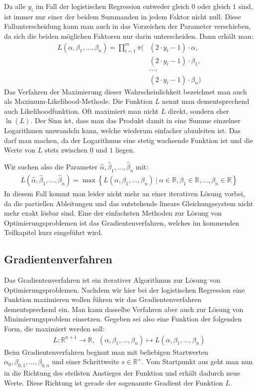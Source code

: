 Da alle $y_i$ im Fall der logistischen Regression entweder gleich $0$ oder gleich $1$ sind, ist immer nur einer der beidem Summanden in jedem Faktor nicht null. Diese Fallunterscheidung kann man auch in das Vorzeichen der Parameter verschieben, da sich die beiden möglichen Faktoren nur darin unterscheiden. Dann erhält man:
\begin{align*}
    L(\alpha, \beta_1, \dots, \beta_n) = \prod_{i=1}^m \pi(&(2 \cdot y_i - 1) \cdot \alpha, \\
    &(2 \cdot y_i - 1) \cdot \beta_1, \\
    &\dots, \\
    &(2 \cdot y_i - 1) \cdot \beta_n)
\end{align*}
Das Verfahren der Maximierung dieser Wahrscheinlichkeit bezeichnet man auch als Maximum-Likelihood-Methode. Die Funktion $L$ nennt man dementsprechend auch Likelihoodfunktion. Oft maximiert man nicht $L$ direkt, sondern eher $\ln(L)$. Der Sinn ist, dass man das Produkt damit in eine Summe einzelner Logarithmen umwandeln kann, welche wiederum einfacher abzuleiten ist. Das darf man machen, da der Logarithmus eine stetig wachsende Funktion ist und die Werte von $L$ stets zwischen $0$ und $1$ liegen.

Wir suchen also die Parameter $\hat\alpha, \hat\beta_1, \dots, \hat\beta_n$ mit:
\begin{align*}
    L(\hat\alpha, \hat\beta_1, \dots, \hat\beta_n) = \max \left\{ L(\alpha, \beta_1, \dots, \beta_n) ~|~ \alpha \in \mathbb{R}, \beta_1 \in \mathbb{R}, \dots, \beta_n \in \mathbb{R} \right\}
\end{align*}
In diesem Fall kommt man leider nicht mehr an einer iterativen Lösung vorbei, da die partiellen Ableitungen und das entstehende lineare Gleichungssystem nicht mehr exakt lösbar sind. Eine der einfachsten Methoden zur Lösung von Optimierungsproblemen ist das Gradientenverfahren, welches im kommenden Teilkapitel kurz eingeführt wird.

\subsection{Gradientenverfahren}

Das Gradientenverfahren ist ein iterativer Algorithmus zur Lösung von Optimierungsproblemen. Nachdem wir hier bei der logistischen Regression eine Funktion maximieren wollen führen wir das Gradientenverfahren dementsprechend ein. Man kann dasselbe Verfahren aber auch zur Lösung von Minimierungsproblem einsetzen. Gegeben sei also eine Funktion der folgenden Form, die maximiert werden soll:
\begin{align*}
    L: \mathbb{R}^{n+1} \rightarrow \mathbb{R},~~ (\alpha, \beta_1, \dots, \beta_n) \mapsto L(\alpha, \beta_1, \dots, \beta_n)
\end{align*}
Beim Gradientenverfahren beginnt man mit beliebigen Startwerten $\alpha_0, \beta_{0, 1}, \dots, \beta_{0, n}$ und einer Schrittweite $s \in \mathbb{R}^+$. Vom Startpunkt aus geht man nun in die Richtung des steilsten Anstieges der Funktion und erhält dadurch neue Werte. Diese Richtung ist gerade der sogenannte Gradient der Funktion $L$.

